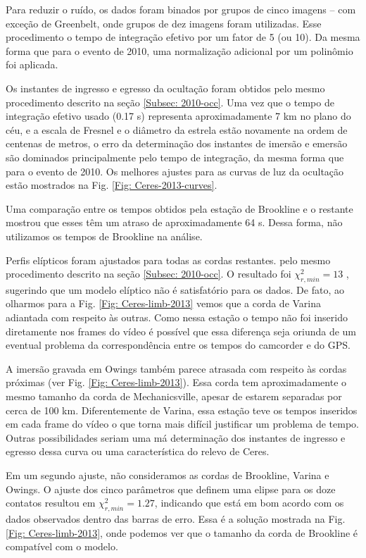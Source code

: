 \documentclass[12pt,a4paper]{monografia}
\begin{document}
Para reduzir o ruído, os dados foram binados por grupos de cinco imagens -- com exceção de Greenbelt, onde grupos de dez imagens foram utilizadas. Esse procedimento o tempo de integração efetivo por um fator de 5 (ou 10). Da mesma forma que para o evento de 2010, uma normalização adicional por um polinômio foi aplicada.

Os instantes de ingresso e egresso da ocultação foram obtidos pelo mesmo procedimento descrito na seção \ref{Subsec: 2010-occ}. Uma vez que o tempo de integração efetivo usado (0.17 s) representa aproximadamente 7 km no plano do céu, e a escala de Fresnel e  o diâmetro da estrela estão novamente na ordem de centenas de metros, o erro da determinação dos instantes de imersão e emersão são dominados principalmente pelo tempo de integração, da mesma forma que para o evento de 2010. Os melhores ajustes para as curvas de luz da ocultação estão mostrados na Fig. \ref{Fig: Ceres-2013-curves}.

Uma comparação entre os tempos obtidos pela estação de Brookline e o restante mostrou que esses têm um atraso de aproximadamente 64 s. Dessa forma, não utilizamos os tempos de Brookline na análise.

Perfis elípticos foram ajustados para todas as cordas restantes. pelo mesmo procedimento descrito na seção \ref{Subsec: 2010-occ}. O resultado foi $\chi^2_{r,min} = 13$ , sugerindo que um modelo elíptico não é satisfatório para os dados. De fato, ao olharmos para a Fig. \ref{Fig: Ceres-limb-2013} vemos que a corda de Varina adiantada com respeito às outras. Como nessa estação o tempo não foi inserido diretamente nos frames do vídeo é possível que essa diferença seja oriunda de um eventual problema da correspondência entre os tempos do camcorder e do GPS.

A imersão gravada em Owings também parece atrasada com respeito às cordas próximas (ver Fig. \ref{Fig: Ceres-limb-2013}). Essa corda tem aproximadamente o mesmo tamanho da corda de Mechanicsville, apesar de estarem separadas por cerca de 100 km. Diferentemente de Varina, essa estação teve os tempos inseridos em cada frame do vídeo o que torna mais difícil justificar um problema de tempo. Outras possibilidades seriam uma má determinação dos instantes de ingresso e egresso dessa curva ou uma característica do relevo de Ceres.

Em um segundo ajuste, não consideramos as cordas de Brookline, Varina e Owings. O ajuste dos cinco parâmetros que definem uma elipse para os doze contatos resultou em $\chi^2_{r,min} = 1.27$, indicando  que está em bom acordo com os dados observados dentro das barras de erro. Essa é a solução mostrada na Fig. \ref{Fig: Ceres-limb-2013}, onde podemos ver que o tamanho da corda de Brookline é compatível com o modelo.
\end{document}
